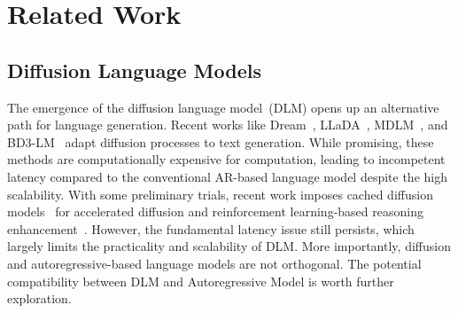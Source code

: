 \section{Related Work}

\subsection{Diffusion Language Models}

The emergence of the diffusion language model~(DLM) opens up an alternative path for language generation. 
Recent works like Dream~\cite{dream2025}, LLaDA~\cite{nie2025large}, MDLM~\cite{sahoo2024simple}, and BD3-LM~\cite{arriola2025block} adapt diffusion processes to text generation. While promising, these methods are computationally expensive for computation, leading to incompetent latency compared to the conventional AR-based language model despite the high scalability. 
With some preliminary trials, recent work imposes cached diffusion models~\cite{arriola2025block} for accelerated diffusion and reinforcement learning-based reasoning enhancement~\cite{zhao2025d1}. However, the fundamental latency issue still persists, which largely limits the practicality and scalability of DLM. More importantly, diffusion and autoregressive-based language models are not orthogonal. The potential compatibility between DLM and Autoregressive Model is worth further exploration. 



